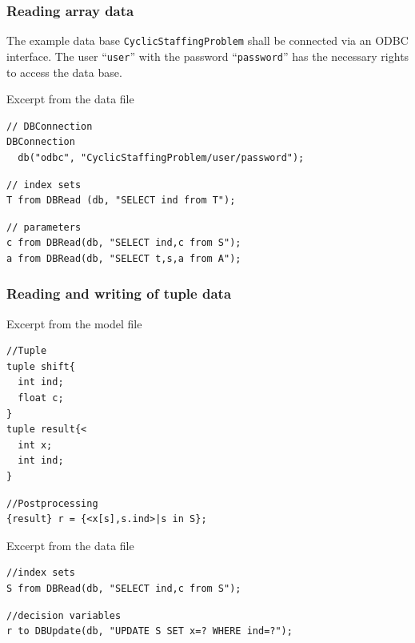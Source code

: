 \begin{frame}[fragile]
 \frametitle{Reading array data}
 The example data base \texttt{CyclicStaffingProblem} shall be connected via an ODBC interface. The user ``\texttt{user}'' with the password ``\texttt{password}'' has the necessary rights to access the data base.
 \begin{block}{Excerpt from the data file}
\begin{lstlisting}[language=opldata,numbers=none,basicstyle=\ttfamily\scriptsize]
// DBConnection
DBConnection 
  db("odbc", "CyclicStaffingProblem/user/password");
\end{lstlisting}\vspace{-2\baselineskip}
\begin{lstlisting}[language=opldata,numbers=none,basicstyle=\ttfamily\scriptsize]
// index sets
T from DBRead (db, "SELECT ind from T");
\end{lstlisting}\vspace{-2\baselineskip}
\begin{lstlisting}[language=opldata,numbers=none,basicstyle=\ttfamily\scriptsize]
// parameters
c from DBRead(db, "SELECT ind,c from S");
a from DBRead(db, "SELECT t,s,a from A");
\end{lstlisting}
 \end{block}
\end{frame}

\begin{frame}[fragile]
 \frametitle{Reading and writing of tuple data}
 \begin{block}{Excerpt from the model file}
\begin{lstlisting}[language=opl,numbers=none,basicstyle=\ttfamily\scriptsize]
//Tuple
tuple shift{
  int ind;
  float c;
}
tuple result{<
  int x;
  int ind;
}  
\end{lstlisting}\vspace{-2\baselineskip}
\begin{lstlisting}[language=opl,numbers=none,basicstyle=\ttfamily\scriptsize]
//Postprocessing
{result} r = {<x[s],s.ind>|s in S};
\end{lstlisting}
 \end{block}\vspace{-2\baselineskip}
 \begin{block}{Excerpt from the data file}
\begin{lstlisting}[language=opldata,numbers=none,basicstyle=\ttfamily\scriptsize]
//index sets
S from DBRead(db, "SELECT ind,c from S");
\end{lstlisting}\vspace{-2\baselineskip}
\begin{lstlisting}[language=opldata,numbers=none,basicstyle=\ttfamily\scriptsize]
//decision variables
r to DBUpdate(db, "UPDATE S SET x=? WHERE ind=?");
\end{lstlisting}
 \end{block}
\end{frame}

